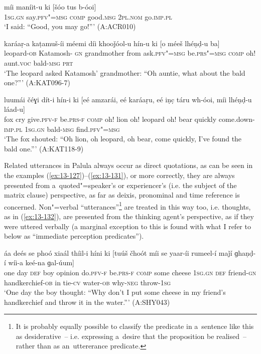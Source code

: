 \begin{exe}
\ex
\label{ex:13-129}
\gll míi maníit-u ki [šóo tus b-óoi]  \\
\textsc{1sg.gn} say.\textsc{pfv"=msg} \textsc{comp} good.\textsc{msg} \textsc{2pl.nom} go.\textsc{imp.pl} \\
\glt `I said: ``Good, you may go!''' (A:ACR010)

\ex
\label{ex:13-130}
\gll karáaṛ-a kaṭamuš-íi méemi díi  khooǰóol-u hín-u ki [o méeš  lhéṇḍ-u ba] \\
leopard-\textsc{ob} Katamosh-\textsc{ gn} grandmother from  ask.\textsc{pfv"=msg} be.\textsc{prs"=msg} \textsc{comp} oh! aunt.\textsc{voc}  bald-\textsc{msg} \textsc{prt } \\
\glt `The leopard asked Katamosh' grandmother: ``Oh auntie, what about the bald one?''' (A:KAT096-7)

\ex
\label{ex:13-131}
\gll luumái čéɣi dít-i hín-i ki [eé amzarái,  eé karáaṛu,
  eé iṇc̣ táru wh-óoi, míi  lhéṇḍ-u láad-u] \\
fox cry give.\textsc{pfv-f} be.\textsc{prs-f} \textsc{comp} oh! lion  oh! leopard oh! bear quickly come.down-\textsc{imp.pl} \textsc{1sg.gn} bald-\textsc{msg} find.\textsc{pfv"=msg}  \\
\glt `The fox shouted: ``Oh lion, oh leopard, oh bear, come quickly, I've found the bald one.''' (A:KAT118-9) 
\end{exe}

Related utterances in Palula always occur as direct quotations, as can be seen in the examples (\ref{ex:13-127})--(\ref{ex:13-131}), or more correctly, they are always presented from a~quoted"=speaker's or experiencer's (i.e. the subject of the matrix clause) perspective, as far as deixis, pronominal and time reference is concerned. Non"=verbal ``utterances''\footnote{It is probably equally possible to classify the predicate in a~sentence like this as desiderative~-- i.e. expressing a~desire that the proposition be realised~-- rather than as an~uttererance predicate.} are treated in this way too, i.e. thoughts, as in (\ref{ex:13-132}), are presented from the thinking agent's perspective, as if they were uttered verbally (a marginal exception to this is found with what I refer to below as ``immediate perception predicates''). 

\begin{exe}
\ex
\label{ex:13-132}
\gll áa deés se phoó xiaál thíil-i híni ki  [tuúš čhoót míi
  se yaar-íi rumeel-í  maǰí ɡhaṇḍ-í wíi-a keé-na ɡal-úum] \\
one day \textsc{def} boy opinion do.\textsc{pfv-f} be.\textsc{prs-f} \textsc{comp}   some cheese \textsc{1sg.gn} \textsc{def} friend-\textsc{gn} handkerchief-\textsc{ob}  in tie-\textsc{cv} water-\textsc{ob} why-\textsc{neg} throw-\textsc{1sg} \\
\glt `One day the boy thought: ``Why don't I put some cheese in my friend's handkerchief and throw it in the water.''' (A:SHY043)
\end{exe}

